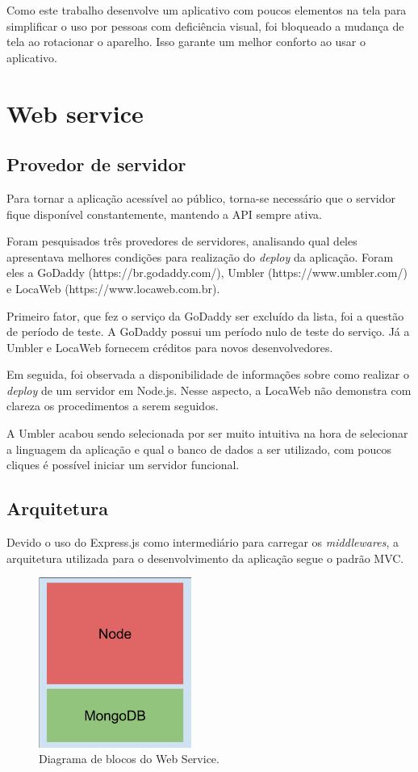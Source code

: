 \documentclass[
	12pt,				%
	oneside,			%
	a4paper,			%
	brazil				%
]{abntex2}
\begin{document}
Como este trabalho desenvolve um aplicativo com poucos elementos na tela para simplificar o uso por pessoas com deficiência visual, foi bloqueado a mudança de tela ao rotacionar o aparelho. Isso garante um melhor conforto ao usar o aplicativo.


\section{Web service}

\subsection{Provedor de servidor}

Para tornar a aplicação acessível ao público, torna-se necessário que o servidor fique disponível constantemente, mantendo a API sempre ativa. 

Foram pesquisados três provedores de servidores, analisando qual deles apresentava melhores condições para realização do \textit{deploy} da aplicação. Foram eles a GoDaddy (https://br.godaddy.com/), Umbler (https://www.umbler.com/) e LocaWeb (https://www.locaweb.com.br).

Primeiro fator, que fez o serviço da GoDaddy ser excluído da lista, foi a questão de período de teste. A GoDaddy possui um período nulo de teste do serviço. Já a Umbler e LocaWeb fornecem créditos para novos desenvolvedores.

Em seguida, foi observada a disponibilidade de informações sobre como realizar o \textit{deploy} de um servidor em Node.js. Nesse aspecto, a LocaWeb não demonstra com clareza os procedimentos a serem seguidos.

A Umbler acabou sendo selecionada por ser muito intuitiva na hora de selecionar a linguagem da aplicação e qual o banco de dados a ser utilizado, com poucos cliques é possível iniciar um servidor funcional.


\subsection{Arquitetura}

Devido o uso do Express.js como intermediário para carregar os \textit{middlewares}, a arquitetura utilizada para o desenvolvimento da aplicação segue o padrão MVC.

\begin{figure}[H]
\centering
\includegraphics[width=5cm, center]{images/brick_diagram_framework_webservice}
\caption{Diagrama de blocos do Web Service.}
\label{Rotulo}
\end{figure}
\end{document}
